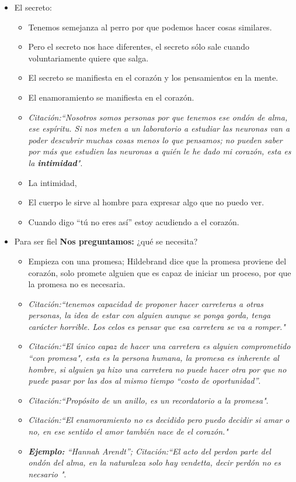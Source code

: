 \begin{itemize}
    \item El secreto:
        \begin{itemize}
            \item Tenemos semejanza al perro por que podemos hacer cosas similares.
            \item Pero el secreto nos hace diferentes, el secreto sólo sale cuando voluntariamente quiere que salga.
            \item El secreto se manifiesta en el corazón y los pensamientos en la mente.
            \item El enamoramiento se manifiesta en el corazón.
            \item \emph{Citación:``Nosotros somos personas por que tenemos ese ondón de alma, ese espíritu. Si nos meten a un laboratorio a estudiar las neuronas van a poder descubrir muchas cosas menos lo que pensamos; no pueden saber por más que estudien las neuronas a quién le he dado mi corazón, esta es la \textbf{intimidad}"}.
            \item La intimidad, 
            \item El cuerpo le sirve al hombre para expresar algo que no puedo ver.
            \item Cuando digo ``tú no eres así'' estoy acudiendo a el corazón.
        \end{itemize}
    
    \item Para ser fiel \textbf{Nos preguntamos:} ¿qué se necesita?
        \begin{itemize}
            \item Empieza con una promesa; Hildebrand dice que la promesa proviene del corazón, solo promete alguien que es capaz de iniciar un proceso, por que la promesa no es necesaria.
            \item \emph{Citación:``tenemos capacidad de proponer hacer carreteras a otras personas, la idea de estar con alguien aunque se ponga gorda, tenga carácter horrible. Los celos es pensar que esa carretera se va a romper."} 
            \item \emph{Citación:``El único capaz de hacer una carretera es alguien comprometido ``con promesa", esta es la persona humana, la promesa es inherente al hombre, si alguien ya hizo una carretera no puede hacer otra por que no puede pasar por las dos al mismo tiempo ``costo de oportunidad''}.
            \item \emph{Citación:``Propósito de un anillo, es un recordatorio a la promesa"}.
            \item \emph{Citación:``El enamoramiento no es decidido pero puedo decidir si amar o no, en ese sentido el amor también nace de el corazón."} 
            \item \emph{\textbf{Ejemplo: }``Hannah Arendt''; \emph{Citación:``El acto del perdon parte del ondón del alma, en la naturaleza solo hay vendetta, decir perdón no es necsario "}}.
        \end{itemize}
    

\end{itemize}
